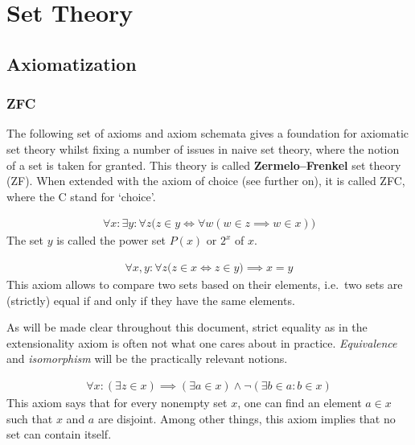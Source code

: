 \chapter{Set Theory}

    \minitoc

\section{Axiomatization}\label{section:axiomatization}
\subsection{ZFC}

    The following set of axioms and axiom schemata gives a foundation for axiomatic set theory whilst fixing a number of issues in naive set theory, where the notion of a set is taken for granted. This theory is called \textbf{Zermelo--Frenkel} set theory (ZF). When extended with the axiom of choice (see further on), it is called ZFC, where the C stand for `choice'.

    \begin{axiom}\label{set:power_set_axiom}
        \begin{gather}
            \forall x:\exists y:\forall z\bigl(z\in y\iff\forall w(w\in z\implies w\in x)\bigr)
        \end{gather}
        The set $y$ is called the power set $P(x)$ or $2^x$ of $x$.
    \end{axiom}

    \begin{axiom}[Extensionality]
        \begin{gather}
            \forall x,y:\forall z\bigl(z\in x\iff z\in y\bigr)\implies x=y
        \end{gather}
        This axiom allows to compare two sets based on their elements, i.e.~two sets are (strictly) equal if and only if they have the same elements.
    \end{axiom}
    \begin{remark}
        As will be made clear throughout this document, strict equality as in the extensionality axiom is often not what one cares about in practice. \textit{Equivalence} and \textit{isomorphism} will be the practically relevant notions.
    \end{remark}

    \begin{axiom}
        \begin{gather}
            \forall x:(\exists z\in x)\implies(\exists a\in x)\land\neg(\exists b\in a:b\in x)
        \end{gather}
        This axiom says that for every nonempty set $x$, one can find an element $a\in x$ such that $x$ and $a$ are disjoint. Among other things, this axiom implies that no set can contain itself.
    \end{axiom}

